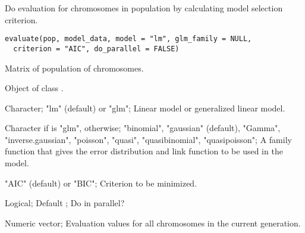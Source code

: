 %
\begin{Description}\relax
Do evaluation for chromosomes in population by calculating model selection criterion.
\end{Description}
%
\begin{Usage}
\begin{verbatim}
evaluate(pop, model_data, model = "lm", glm_family = NULL,
  criterion = "AIC", do_parallel = FALSE)
\end{verbatim}
\end{Usage}
%
\begin{Arguments}
\begin{ldescription}
\item[\code{pop}] Matrix of population of chromosomes.

\item[\code{model\_data}] Object of class .

\item[\code{model}] Character; "lm" (default) or "glm"; Linear model or
generalized linear model.

\item[\code{glm\_family}] Character if  is "glm",  otherwise;
"binomial", "gaussian" (default), "Gamma", "inverse.gaussian", "poisson", "quasi",
"quasibinomial", "quasipoisson"; A family function that gives the error
distribution and link function to be used in the model.

\item[\code{criterion}] "AIC" (default) or "BIC"; Criterion to be minimized.

\item[\code{do\_parallel}] Logical; Default ; Do in parallel?
\end{ldescription}
\end{Arguments}
%
\begin{Value}
Numeric vector; Evaluation values for all chromosomes
in the current generation.
\end{Value}
